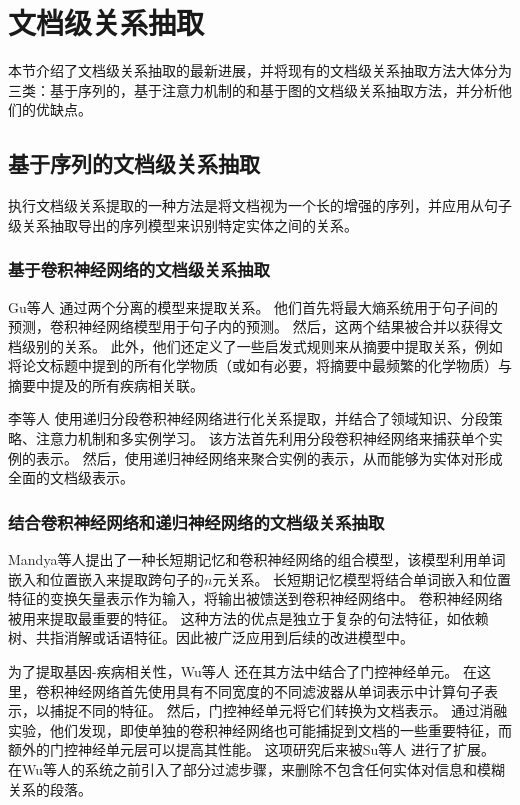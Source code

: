 \documentclass[bachelor]{thesis-uestc}
\begin{document}
\section{文档级关系抽取}
本节介绍了文档级关系抽取的最新进展，并将现有的文档级关系抽取方法大体分为三类：基于序列的，基于注意力机制的和基于图的文档级关系抽取方法，并分析他们的优缺点。

\subsection{基于序列的文档级关系抽取}
执行文档级关系提取的一种方法是将文档视为一个长的增强的序列，并应用从句子级关系抽取导出的序列模型来识别特定实体之间的关系。

\subsubsection{基于卷积神经网络的文档级关系抽取}
Gu等人 \cite{10.1093/database/bax024}通过两个分离的模型来提取关系。
他们首先将最大熵系统用于句子间的预测，卷积神经网络模型用于句子内的预测。
然后，这两个结果被合并以获得文档级别的关系。
此外，他们还定义了一些启发式规则来从摘要中提取关系，例如将论文标题中提到的所有化学物质（或如有必要，将摘要中最频繁的化学物质）与摘要中提及的所有疾病相关联。\par

李等人 \cite{li2018chemical}
使用递归分段卷积神经网络进行化关系提取，并结合了领域知识、分段策略、注意力机制和多实例学习。
该方法首先利用分段卷积神经网络来捕获单个实例的表示。
然后，使用递归神经网络来聚合实例的表示，从而能够为实体对形成全面的文档级表示。

\subsubsection{结合卷积神经网络和递归神经网络的文档级关系抽取}
Mandya等人提出了一种长短期记忆和卷积神经网络的组合模型，该模型利用单词嵌入和位置嵌入来提取跨句子的$n$元关系。
长短期记忆模型将结合单词嵌入和位置特征的变换矢量表示作为输入，将输出被馈送到卷积神经网络中。
卷积神经网络被用来提取最重要的特征。
这种方法的优点是独立于复杂的句法特征，如依赖树、共指消解或话语特征。因此被广泛应用到后续的改进模型中。

为了提取基因-疾病相关性，Wu等人 \cite{GDA}还在其方法中结合了门控神经单元。
在这里，卷积神经网络首先使用具有不同宽度的不同滤波器从单词表示中计算句子表示，以捕捉不同的特征。
然后，门控神经单元将它们转换为文档表示。
通过消融实验，他们发现，即使单独的卷积神经网络也可能捕捉到文档的一些重要特征，而额外的门控神经单元层可以提高其性能。
这项研究后来被Su等人 \cite{renet2} 进行了扩展。
在Wu等人的系统之前引入了部分过滤步骤，来删除不包含任何实体对信息和模糊关系的段落。
\end{document}
